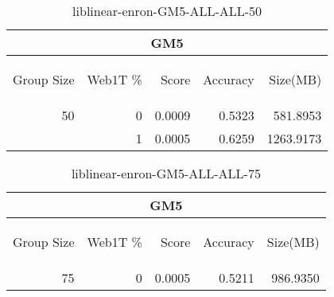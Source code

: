\begin{center}
\begin{table}[htbp]
\begin{tabular}{ | r | r | r | r | r |}
\hline
\multicolumn{5}{|c|}{GM5}\\
\hline
\begin{sideways}Group Size\end{sideways} & \begin{sideways}Web1T \%\end{sideways} & \begin{sideways}Score\end{sideways} & \begin{sideways}Accuracy\end{sideways} & \begin{sideways}Size(MB)\end{sideways}\\
\hline
\multirow{1}{*}{50}
 & 0 & 0.0009 & 0.5323 & 581.8953\\ \cline{2-5}
 & 1 & 0.0005 & 0.6259 & 1263.9173\\ \cline{2-5}
\hline
\end{tabular}
\caption{liblinear-enron-GM5-ALL-ALL-50}
\label{table:liblinear-enron-GM5-ALL-ALL-50}
\end{table}
\end{center}

\begin{center}
\begin{table}[htbp]
\begin{tabular}{ | r | r | r | r | r |}
\hline
\multicolumn{5}{|c|}{GM5}\\
\hline
\begin{sideways}Group Size\end{sideways} & \begin{sideways}Web1T \%\end{sideways} & \begin{sideways}Score\end{sideways} & \begin{sideways}Accuracy\end{sideways} & \begin{sideways}Size(MB)\end{sideways}\\
\hline
\multirow{0}{*}{75}
 & 0 & 0.0005 & 0.5211 & 986.9350\\ \cline{2-5}
\hline
\end{tabular}
\caption{liblinear-enron-GM5-ALL-ALL-75}
\label{table:liblinear-enron-GM5-ALL-ALL-75}
\end{table}
\end{center}

